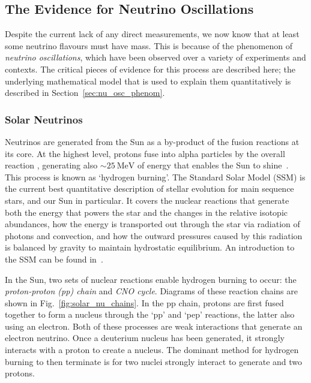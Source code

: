 \subsection{The Evidence for Neutrino Oscillations}\label{sec:nu_osc_evidence}
Despite the current lack of any direct measurements, we now know that at least some neutrino flavours must have mass. This is because of the phenomenon of \textit{neutrino oscillations}, which have been observed over a variety of experiments and contexts. The critical pieces of evidence for this process are described here; the underlying mathematical model that is used to explain them quantitatively is described in Section~\ref{sec:nu_osc_phenom}.

\subsubsection{Solar Neutrinos}
Neutrinos are generated from the Sun as a by-product of the fusion reactions at its core. At the highest level, protons fuse into alpha particles by the overall reaction , generating also $\sim\SI{25}{\MeV}$ of energy that enables the Sun to shine~\cite{bahcallNeutrinoAstrophysics1989}. %
This process is known as `hydrogen burning'. The Standard Solar Model (SSM) is the current best quantitative description of stellar evolution for main sequence stars, and our Sun in particular. It covers the nuclear reactions that generate both the energy that powers the star and the changes in the relative isotopic abundances, how the energy is transported out through the star via radiation of photons and convection, and how the outward pressures caused by this radiation is balanced by gravity to maintain hydrostatic equilibrium. An introduction to the SSM can be found in~\cite{bahcallNeutrinoAstrophysics1989}. %

In the Sun, two sets of nuclear reactions enable hydrogen burning to occur: the \textit{proton-proton (pp) chain} and \textit{CNO cycle}. Diagrams of these reaction chains are shown in Fig.~\ref{fig:solar_nu_chains}. In the pp chain, protons are first fused together to form a  nucleus through the `pp' and `pep' reactions, the latter also using an electron. Both of these processes are weak interactions that generate an electron neutrino. Once a deuterium nucleus has been generated, it strongly interacts with a proton to create a  nucleus. The dominant method for hydrogen burning to then terminate is for two  nuclei strongly interact to generate  and two protons.


